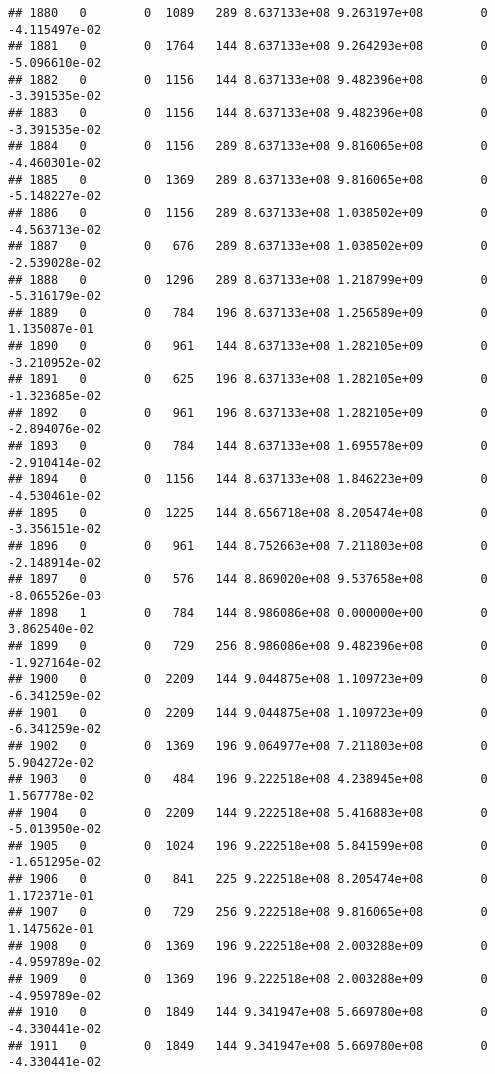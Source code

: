 \documentclass[
]{article}
\begin{document}
\begin{enumerate}
\begin{verbatim}
## 1880   0        0  1089   289 8.637133e+08 9.263197e+08        0 -4.115497e-02
## 1881   0        0  1764   144 8.637133e+08 9.264293e+08        0 -5.096610e-02
## 1882   0        0  1156   144 8.637133e+08 9.482396e+08        0 -3.391535e-02
## 1883   0        0  1156   144 8.637133e+08 9.482396e+08        0 -3.391535e-02
## 1884   0        0  1156   289 8.637133e+08 9.816065e+08        0 -4.460301e-02
## 1885   0        0  1369   289 8.637133e+08 9.816065e+08        0 -5.148227e-02
## 1886   0        0  1156   289 8.637133e+08 1.038502e+09        0 -4.563713e-02
## 1887   0        0   676   289 8.637133e+08 1.038502e+09        0 -2.539028e-02
## 1888   0        0  1296   289 8.637133e+08 1.218799e+09        0 -5.316179e-02
## 1889   0        0   784   196 8.637133e+08 1.256589e+09        0  1.135087e-01
## 1890   0        0   961   144 8.637133e+08 1.282105e+09        0 -3.210952e-02
## 1891   0        0   625   196 8.637133e+08 1.282105e+09        0 -1.323685e-02
## 1892   0        0   961   196 8.637133e+08 1.282105e+09        0 -2.894076e-02
## 1893   0        0   784   144 8.637133e+08 1.695578e+09        0 -2.910414e-02
## 1894   0        0  1156   144 8.637133e+08 1.846223e+09        0 -4.530461e-02
## 1895   0        0  1225   144 8.656718e+08 8.205474e+08        0 -3.356151e-02
## 1896   0        0   961   144 8.752663e+08 7.211803e+08        0 -2.148914e-02
## 1897   0        0   576   144 8.869020e+08 9.537658e+08        0 -8.065526e-03
## 1898   1        0   784   144 8.986086e+08 0.000000e+00        0  3.862540e-02
## 1899   0        0   729   256 8.986086e+08 9.482396e+08        0 -1.927164e-02
## 1900   0        0  2209   144 9.044875e+08 1.109723e+09        0 -6.341259e-02
## 1901   0        0  2209   144 9.044875e+08 1.109723e+09        0 -6.341259e-02
## 1902   0        0  1369   196 9.064977e+08 7.211803e+08        0  5.904272e-02
## 1903   0        0   484   196 9.222518e+08 4.238945e+08        0  1.567778e-02
## 1904   0        0  2209   144 9.222518e+08 5.416883e+08        0 -5.013950e-02
## 1905   0        0  1024   196 9.222518e+08 5.841599e+08        0 -1.651295e-02
## 1906   0        0   841   225 9.222518e+08 8.205474e+08        0  1.172371e-01
## 1907   0        0   729   256 9.222518e+08 9.816065e+08        0  1.147562e-01
## 1908   0        0  1369   196 9.222518e+08 2.003288e+09        0 -4.959789e-02
## 1909   0        0  1369   196 9.222518e+08 2.003288e+09        0 -4.959789e-02
## 1910   0        0  1849   144 9.341947e+08 5.669780e+08        0 -4.330441e-02
## 1911   0        0  1849   144 9.341947e+08 5.669780e+08        0 -4.330441e-02

\end{verbatim}
\end{enumerate}
\end{document}
